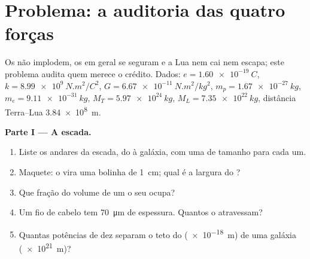 \section{Problema: a auditoria das quatro forças}

\begin{problem}
\label{pb:g11:fundamental-interactions:1}
Os  não implodem, os  em geral se seguram e a Lua nem cai
nem escapa; este problema audita quem merece o crédito. Dados:
$e = \qty{1.60e-19}{C}$, $k = \qty{8.99e9}{N.m^2/C^2}$,
$G = \qty{6.67e-11}{N.m^2/kg^2}$, $m_p = \qty{1.67e-27}{kg}$,
$m_e = \qty{9.11e-31}{kg}$, $M_T = \qty{5.97e24}{kg}$,
$M_L = \qty{7.35e22}{kg}$, distância Terra--Lua \qty{3.84e8}{m}.

\medskip
\noindent\textbf{Parte I --- A escada.}
\begin{enumerate}
  \item Liste os andares da escada, do  à galáxia, com uma  de tamanho para cada um.
  \item Maquete: o  vira uma bolinha de \qty{1}{cm}; qual é a
        largura do ?
  \item Que fração do volume de um  o seu  ocupa?
  \item Um fio de cabelo tem \qty{70}{\micro m} de espessura. Quantos
         o atravessam?
  \item Quantas potências de dez separam o teto do 
        (\qty{e-18}{m}) de uma galáxia (\qty{e21}{m})?
\end{enumerate}


\end{problem}
